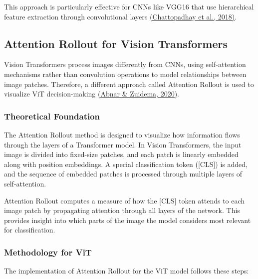 \documentclass[a4paper,12pt]{article}
\begin{document}
This approach is particularly effective for CNNs like VGG16 that use hierarchical feature extraction through convolutional layers \href{https://www.sciencedirect.com/science/article/pii/S0893608018302107}{(Chattopadhay et al., 2018)}.

\subsection{Attention Rollout for Vision Transformers}

Vision Transformers process images differently from CNNs, using self-attention mechanisms rather than convolution operations to model relationships between image patches. Therefore, a different approach called Attention Rollout is used to visualize ViT decision-making \href{https://arxiv.org/abs/2005.00928}{(Abnar \& Zuidema, 2020)}.

\subsubsection{Theoretical Foundation}

The Attention Rollout method is designed to visualize how information flows through the layers of a Transformer model. In Vision Transformers, the input image is divided into fixed-size patches, and each patch is linearly embedded along with position embeddings. A special classification token ([CLS]) is added, and the sequence of embedded patches is processed through multiple layers of self-attention.

Attention Rollout computes a measure of how the [CLS] token attends to each image patch by propagating attention through all layers of the network. This provides insight into which parts of the image the model considers most relevant for classification.

\subsubsection{Methodology for ViT}

The implementation of Attention Rollout for the ViT model follows these steps:
\end{document}
